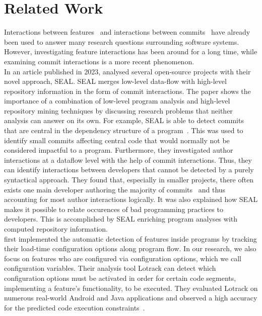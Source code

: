 \chapter{Related Work}\label{ch:related_work}

Interactions between features~\cite{lillack2014tracking,kolesnikov2017relation} and interactions between commits~\cite{sattler2023seal} have already been used to answer many research questions surrounding software systems.
However, investigating feature interactions has been around for a long time, while examining commit interactions is a more recent phenomenon. \\
In an article published in 2023, \citet{sattler2023seal} analysed several open-source projects with their novel approach, SEAL.
SEAL merges low-level data-flow with high-level repository information in the form of commit interactions.
The paper shows the importance of a combination of low-level program analysis and high-level repository mining techniques by discussing research problems that neither analysis can answer on its own.
For example, SEAL is able to detect commits that are central in the dependency structure of a program~\cite{sattler2023seal}.
This was used to identify small commits affecting central code that would normally not be considered impactful to a program.
Furthermore, they investigated author interactions at a dataflow level with the help of commit interactions.
Thus, they can identify interactions between developers that cannot be detected by a purely syntactical approach.
They found that, especially in smaller projects, there often exists one main developer authoring the majority of commits~\cite{sattler2023seal} and thus accounting for most author interactions logically. 
It was also explained how SEAL makes it possible to relate occurences of bad programming practices to developers. 
This is accomplished by SEAL enriching program analyses with computed repository information. \\
\citet{lillack2014tracking} first implemented the automatic detection of features inside programs by tracking their load-time configuration options along program flow.
In our research, we also focus on features who are configured via configuration options, which we call configuration variables. 
Their analysis tool Lotrack can detect which configuration options must be activated in order for certain code segments, implementing a feature's functionality, to be executed.
They evaluated Lotrack on numerous real-world Android and Java applications and observed a high accuracy for the predicted code execution constraints~\cite{lillack2014tracking}.
